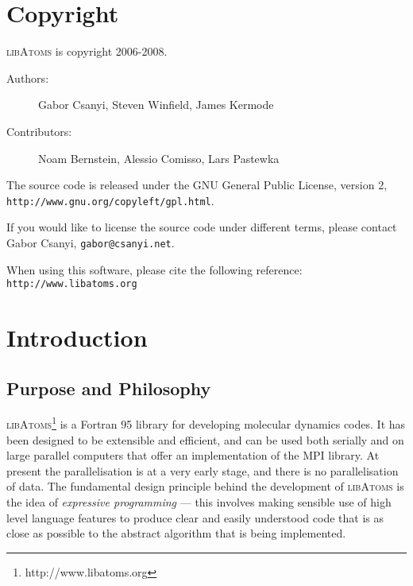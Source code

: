 
\section{Copyright}

\textsc{libAtoms} is copyright 2006-2008.

\begin{description}
\item[Authors:] Gabor Csanyi, Steven Winfield, James Kermode
\item[Contributors:] Noam Bernstein, Alessio Comisso, Lars Pastewka
\end{description}

The source code is released under the GNU General Public License,
version 2, \\ \texttt{http://www.gnu.org/copyleft/gpl.html}.

If you would like to license the source code under different terms,
please contact Gabor Csanyi, \texttt{gabor@csanyi.net}.

When using this software, please cite the following reference:
\texttt{http://www.libatoms.org}

\section{Introduction}

\subsection*{Purpose and Philosophy}

\textsc{libAtoms}\footnote{http://www.libatoms.org} is a Fortran 95
library for developing molecular dynamics codes. It has been designed
to be extensible and efficient, and can be used both serially and on
large parallel computers that offer an implementation of the MPI
library. At present the parallelisation is at a very early stage, and
there is no parallelisation of data. The fundamental design principle
behind the development of \textsc{libAtoms} is the idea of
\emph{expressive programming} --- this involves making sensible use of
high level language features to produce clear and easily understood
code that is as close as possible to the abstract algorithm that is
being implemented.

